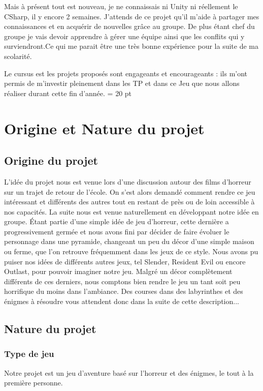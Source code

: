 \documentclass[12pt,a4paper]{article}
\begin{document}
	Mais à présent tout est nouveau, je ne connaissais ni Unity ni réellement le CSharp, il y encore 2 semaines. J'attends de ce projet qu'il m'aide à partager mes connaissances et en acquérir de nouvelles grâce au groupe. De plus étant chef du groupe je vais devoir apprendre à gérer une équipe ainsi que les conflits qui y surviendront.Ce qui me parait être une très bonne expérience pour la suite de ma scolarité.
	
	Le cursus est les projets proposés sont engageants et encourageants : ils m'ont permis de m'investir pleinement dans les TP et dans ce Jeu que nous allons réaliser durant cette fin d'année.
\baselineskip = 20 pt
\newpage
\section{Origine et Nature du projet}
\subsection{Origine du projet}
L'idée du projet nous est venue lors d'une discussion autour des films
d'horreur sur un trajet de retour de l'école. On s'est alors demandé comment rendre ce
jeu intéressant et différents des autres tout en restant de près ou de loin accessible à nos capacités.
La suite nous est venue naturellement en développant
notre idée en groupe. Étant partie d'une simple idée de jeu d'horreur, cette dernière a progressivement germée et
nous avons fini par décider de faire évoluer le personnage dans une pyramide, changeant un peu du
décor d'une simple maison ou ferme, que l'on retrouve fréquemment dans les jeux de ce style.
Nous avons pu puiser nos idées de différents autres jeux, tel Slender, Resident Evil ou encore Outlast,
pour pouvoir imaginer notre jeu. Malgré un décor complètement différents de ces derniers, nous
comptons bien rendre le jeu un tant soit peu horrifique du moins dans l'ambiance.
Des courses dans des labyrinthes et des énigmes à résoudre vous attendent donc dans la suite de cette
description...

\newpage
\subsection{Nature du projet}
\subsubsection{Type de jeu}
Notre projet est un jeu d'aventure basé sur l'horreur et des énigmes, le tout à la première personne.
\end{document}
